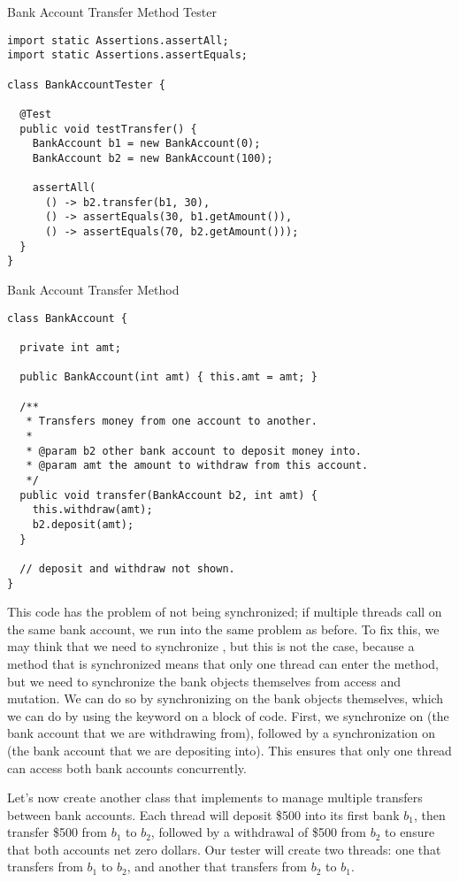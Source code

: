 \begin{cl}{Bank Account Transfer Method Tester}
\begin{lstlisting}[language=MyJava]
import static Assertions.assertAll;
import static Assertions.assertEquals;

class BankAccountTester {

  @Test
  public void testTransfer() {
    BankAccount b1 = new BankAccount(0);
    BankAccount b2 = new BankAccount(100);

    assertAll(
      () -> b2.transfer(b1, 30),
      () -> assertEquals(30, b1.getAmount()),
      () -> assertEquals(70, b2.getAmount()));
  }
}
\end{lstlisting}
\end{cl}

\begin{cl}{Bank Account Transfer Method}
\begin{lstlisting}[language=MyJava]
class BankAccount {

  private int amt;

  public BankAccount(int amt) { this.amt = amt; }

  /**
   * Transfers money from one account to another.
   *
   * @param b2 other bank account to deposit money into.
   * @param amt the amount to withdraw from this account.
   */
  public void transfer(BankAccount b2, int amt) {
    this.withdraw(amt);
    b2.deposit(amt);
  }

  // deposit and withdraw not shown.
}
\end{lstlisting}
\end{cl}

This code has the problem of not being synchronized; if multiple threads call  on the same bank account, we run into the same problem as before. To fix this, we may think that we need to synchronize , but this is not the case, because a method that is synchronized means that only one thread can enter the method, but we need to synchronize the bank objects themselves from access and mutation. We can do so by synchronizing on the bank objects themselves, which we can do by using the  keyword on a block of code. First, we synchronize on  (the bank account that we are withdrawing from), followed by a synchronization on  (the bank account that we are depositing into). This ensures that only one thread can access both bank accounts concurrently.

Let's now create another class that implements  to manage multiple transfers between bank accounts. Each thread will deposit \$500 into its first bank $b_1$, then transfer \$500 from $b_1$ to $b_2$, followed by a withdrawal of \$500 from $b_2$ to ensure that both accounts net zero dollars. Our tester will create two threads: one that transfers from $b_1$ to $b_2$, and another that transfers from $b_2$ to $b_1$.

